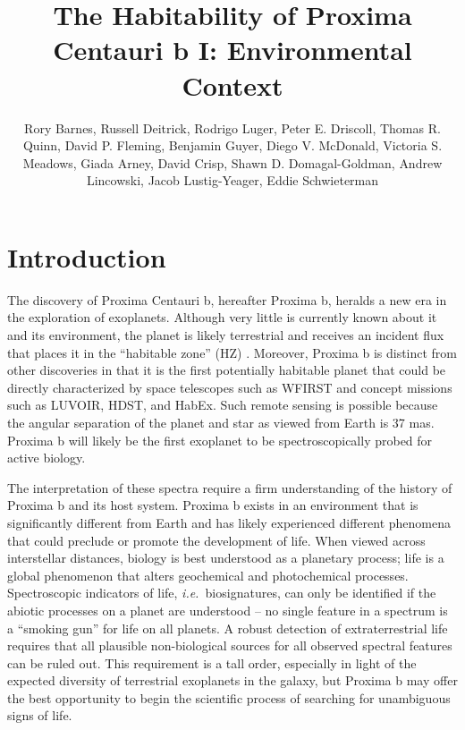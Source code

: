 \documentclass[preprint,12pt]{aastex}
\def\ie{{\it i.e.\ }}
\begin{document}
\title{The Habitability of Proxima Centauri b I: Environmental Context}
\author{Rory Barnes, Russell Deitrick, Rodrigo Luger, Peter E. Driscoll, Thomas R. Quinn, David P. Fleming, Benjamin Guyer, Diego V. McDonald, Victoria S. Meadows, Giada Arney, David Crisp, Shawn D. Domagal-Goldman, Andrew Lincowski, Jacob Lustig-Yeager, Eddie Schwieterman}

\begin{abstract}
\end{abstract}

\section{Introduction\label{sec:intro}}

The discovery of Proxima Centauri b, hereafter Proxima b, heralds a
new era in the exploration of exoplanets. Although very little is
currently known about it and its environment, the planet is likely
terrestrial and receives an incident flux that places it in the
``habitable zone'' (HZ)
\citep{Kasting93,Selsis07,Kopparapu13}. Moreover, Proxima b is
distinct from other discoveries in that it is the first potentially
habitable planet that could be directly characterized by space
telescopes such as WFIRST and concept missions such as LUVOIR, HDST,
and HabEx. Such remote sensing is possible because the angular
separation of the planet and star as viewed from Earth is
37 mas. Proxima b will likely be the first exoplanet to be
spectroscopically probed for active biology.

The interpretation of these spectra require a firm understanding of
the history of Proxima b and its host system. Proxima b exists in an
environment that is significantly different from Earth and has likely
experienced different phenomena that could preclude or promote the
development of life. When viewed across interstellar distances,
biology is best understood as a planetary process; life is a global
phenomenon that alters geochemical and photochemical
processes. Spectroscopic indicators of life, \ie biosignatures, can
only be identified if the abiotic processes on a planet are understood
-- no single feature in a spectrum is a ``smoking gun'' for life on
all planets. A robust detection of extraterrestrial life requires that
all plausible non-biological sources for all observed spectral
features can be ruled out. This requirement is a tall order,
especially in light of the expected diversity of terrestrial
exoplanets in the galaxy, but Proxima b may offer the best opportunity
to begin the scientific process of searching for unambiguous signs of
life.
\end{document}
